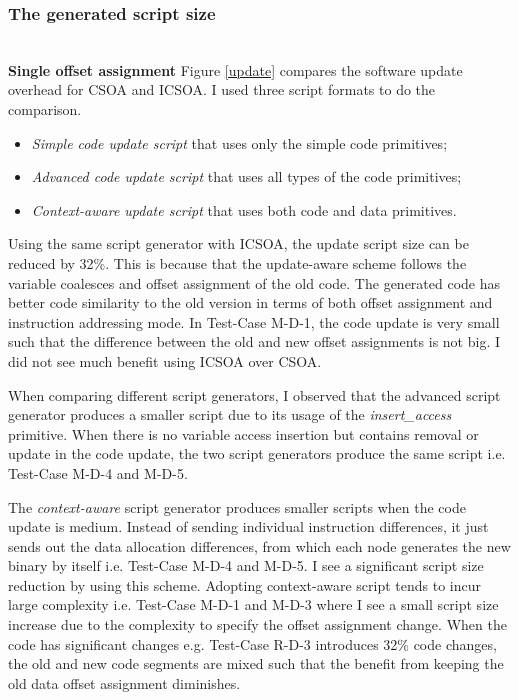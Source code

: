 \subsubsection{The generated script size}
\ \\


\textbf{Single offset assignment}
Figure \ref{update} compares the software update overhead for CSOA and ICSOA. I used three script formats to do the comparison.
\begin{itemize}
\itemsep 0pt
\item
{\it Simple code update script} that uses only the simple code primitives;
\item
{\it Advanced code update script} that uses all types of the code primitives;
\item
{\it Context-aware update script} that uses both code and data primitives.
\end{itemize}

Using the same script generator with ICSOA, the update script size can be reduced by 32\%.
This is because that the update-aware scheme follows the variable coalesces and offset assignment of the old code. The generated code has better code similarity to the old version in terms of both offset assignment and instruction addressing mode. In Test-Case M-D-1, the code update is very small such that the difference between the old and new offset assignments is not big. I did not see much benefit using ICSOA over CSOA. 

When comparing different script generators, I observed that  the advanced script generator produces a smaller script due to its usage of the {\it insert\_access} primitive. When there is no variable access insertion but contains removal or update in the code update, the two script generators produce the same script i.e. Test-Case M-D-4 and M-D-5.


The {\em context-aware} script generator produces smaller scripts when the code update is medium. Instead of sending individual instruction differences, it just sends out the data allocation differences, from which each node generates the new binary by itself i.e. Test-Case M-D-4 and M-D-5. I see a significant script size reduction by using this scheme. 
Adopting context-aware script tends to incur large complexity i.e. Test-Case M-D-1 and M-D-3 where I see a small script size increase due to the complexity to specify the offset assignment change. 
When the code has significant changes e.g. Test-Case R-D-3 introduces 32\% code changes, the old and new code segments are mixed such that the benefit from keeping the old data offset assignment diminishes.

